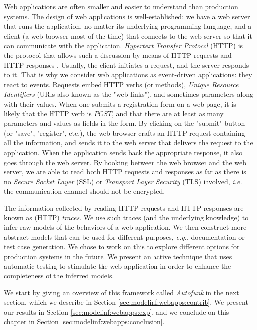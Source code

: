 Web applications are often smaller and easier to understand than
production systems. The design of web applications is
well-established: we have a web server that runs the application,
no matter its underlying programming language, and a client (a
web browser most of the time) that connects to the web server so
that it can communicate with the application. \textit{Hypertext Transfer
Protocol} (HTTP)  is the protocol that allows such a discussion by
means of HTTP requests and HTTP responses \cite{RFC7230}.
Usually, the client initiates a request, and the server responds
to it. That is why we consider web applications as event-driven
applications: they react to events. Requests embed HTTP verbs (or
methods), \textit{Unique Resource Identifiers} (URIs also known
as the "web links"), and sometimes parameters along with their
values. When one submits a registration form on a web page, it is
likely that the HTTP verb is $POST$, and that there are at least
as many parameters and values as fields in the form. By clicking
on the "submit" button (or "save", "register", etc.), the web
browser crafts an HTTP request containing all the information,
and sends it to the web server that delivers the request to the
application. When the application sends back the appropriate
response, it also goes through the web server. By hooking between
the web browser and the web server, we are able to read both HTTP
requests and responses as far as there is no \textit{Secure
Socket Layer} (SSL) or \textit{Transport Layer Security} (TLS)
involved, \emph{i.e.} the communication channel should not be encrypted.

The information collected by reading HTTP requests and HTTP
responses are known as (HTTP) \textit{traces}. We use such traces
(and the underlying knowledge) to infer raw models of the
behaviors of a web application. We then construct more abstract
models that can be used for different purposes, \emph{e.g.},
documentation or test case generation. We chose to work on this
to explore different options for production systems in the
future. We present an active technique that uses automatic
testing to stimulate the web application in order to enhance the
completeness of the inferred models.

We start by giving an overview of this framework called
\emph{Autofunk} in the next section, which we describe in Section
\ref{sec:modelinf:webapps:contrib}.  We present our results in
Section \ref{sec:modelinf:webapps:exp}, and we conclude on this
chapter in Section \ref{sec:modelinf:webapps:conclusion}.

